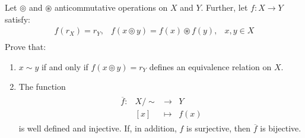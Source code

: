 \documentclass{tufte-handout}
\begin{document}
\begin{problem}
	Let $\circledcirc$ and $\circledast$ anticommutative operations on $X$ and $Y$. Further, let $f: X \to Y$ satisfy:
	$$\begin{array}{ccc}
		f(r_X) = r_Y, & f(x \circledcirc y) = f(x) \circledast f(y),& x, y \in X\\
	\end{array}$$
	Prove that:
	\begin{enumerate}
		\item $x \sim y$ if and only if $f(x \circledcirc y) = r_Y$ defines an equivalence relation on $X$.
		\item The function
		\begin{align*}
			\begin{matrix}
				\overline{f}: &X/\sim &\to& Y\\
				&[x] & \mapsto&f(x)
			\end{matrix}
		\end{align*}
		is well defined and injective. If, in addition, $f$ is surjective, then $\overline{f}$ is bijective.
	\end{enumerate}
\end{problem}
\end{document}
